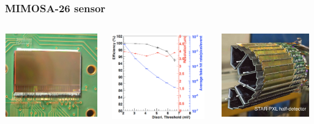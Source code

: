 \documentclass{beamer}
\begin{document}
\begin{frame}
\begin{columns}[t]
  \end{columns}

\end{frame}


\begin{frame}
  \frametitle{MIMOSA-26 sensor}

  \vspace{-0.5cm}
  \begin{columns}[c]
    \begin{column}{4cm}
      \begin{center}
        \includegraphics[width = 4.0cm,height=3.6cm]{Pictures/mi26.jpg}
      \end{center}
    \end{column}

    \begin{column}{4cm}
      \begin{center}
        \includegraphics[width = 4.0cm]{Pictures/efficiency_mi26.png}

      \end{center}
    \end{column}
    \begin{column}{4cm}
      \begin{center}
        \includegraphics[width = 4.0cm, height=3.6cm]{Pictures/pxlFinal_sideView_smallSize.jpg}
      \end{center}
    \end{column}
  \end{columns}


\end{frame}
\end{document}
